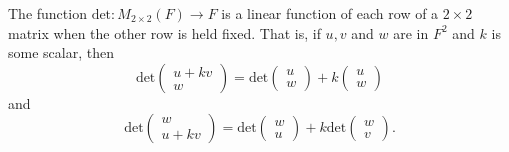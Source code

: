 \begin{theorem}
    The function \( \text{det}: {M}_{2 \times 2}(F) \to F  \) is a linear function of each row of a \( 2 \times 2  \) matrix when the other row is held fixed. That is, if \( u,v  \) and \( w  \) are in \( F^{2} \) and \( k  \) is some scalar, then
    \[  \text{det}\begin{pmatrix}
        u + kv \\
        w 
    \end{pmatrix} = \text{det}\begin{pmatrix}
        u \\
        w 
    \end{pmatrix}  + k \begin{pmatrix}
        u \\
        w 
    \end{pmatrix}  \] and 
    \[  \text{det} \begin{pmatrix}
        w \\
        u + kv
    \end{pmatrix} = \text{det}\begin{pmatrix}
        w \\
        u 
    \end{pmatrix} + k \text{det}\begin{pmatrix}
        w \\
        v
    \end{pmatrix}. \]
\end{theorem}
